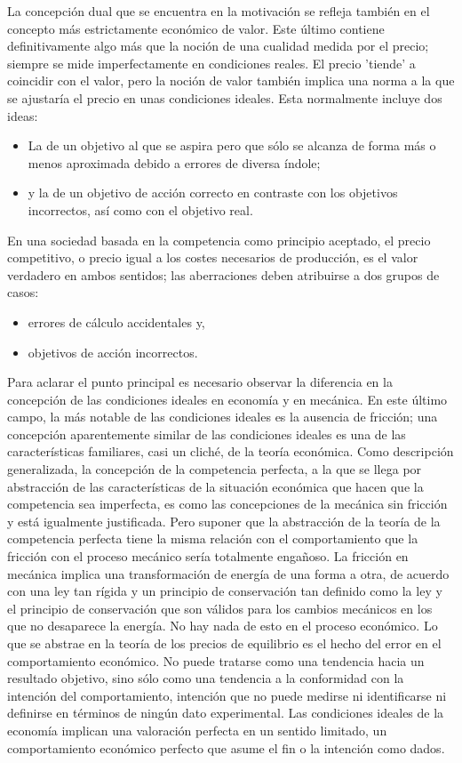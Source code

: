 La concepción dual que se encuentra en la motivación se refleja también en el concepto más estrictamente económico de valor. Este último contiene definitivamente algo más que la noción de una cualidad medida por el precio; siempre se mide imperfectamente en condiciones reales. El precio 'tiende' a coincidir con el valor, pero la noción de valor también implica una norma a la que se ajustaría el precio en unas condiciones ideales. Esta normalmente incluye dos ideas:
\begin{itemize}
    \item La de un objetivo al que se aspira pero que sólo se alcanza de forma más o menos aproximada debido a errores de diversa índole;
    \item y la de un objetivo de acción correcto en contraste con los objetivos incorrectos, así como con el objetivo real.
\end{itemize}
En una sociedad basada en la competencia como principio aceptado, el precio competitivo, o precio igual a los costes necesarios de producción, es el valor verdadero en ambos sentidos;  las aberraciones deben atribuirse a dos grupos de casos:
\begin{itemize}
    \item errores de cálculo accidentales y,
    \item objetivos de acción incorrectos.
\end{itemize}

Para aclarar el punto principal es necesario observar la diferencia en la concepción de las condiciones ideales en economía y en mecánica. En este último campo, la más notable de las condiciones ideales es la ausencia de fricción; una concepción aparentemente similar de las condiciones ideales es una de las características familiares, casi un cliché, de la teoría económica. Como descripción generalizada, la concepción de la competencia perfecta, a la que se llega por abstracción de las características de la situación económica que hacen que la competencia sea imperfecta, es como las concepciones de la mecánica sin fricción y está igualmente justificada. Pero suponer que la abstracción de la teoría de la competencia perfecta tiene la misma relación con el comportamiento que la fricción con el proceso mecánico sería totalmente engañoso. La fricción en mecánica implica una transformación de energía de una forma a otra, de acuerdo con una ley tan rígida y un principio de conservación tan definido como la ley y el principio de conservación que son válidos para los cambios mecánicos en los que no desaparece la energía. No hay nada de esto en el proceso económico. Lo que se abstrae en la teoría de los precios de equilibrio es el hecho del error en el comportamiento económico.  No puede tratarse como una tendencia hacia un resultado objetivo, sino sólo como una tendencia a la conformidad con la intención del comportamiento, intención que no puede medirse ni identificarse ni definirse en términos de ningún dato experimental. Las condiciones ideales de la economía implican una valoración perfecta en un sentido limitado, un comportamiento económico perfecto que asume el fin o la intención como dados.\\

